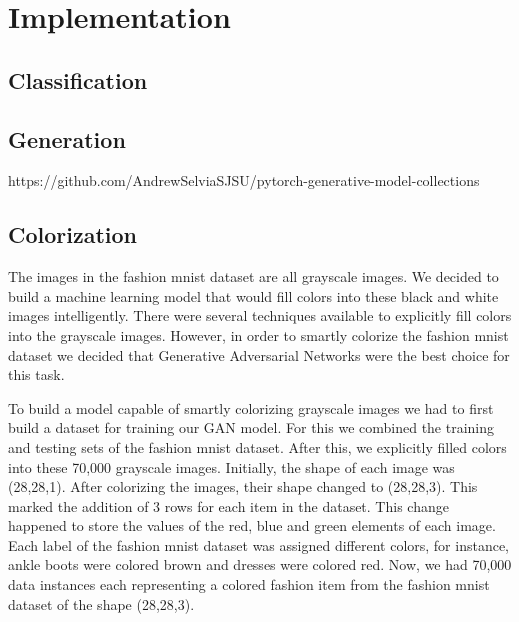 \documentclass[conference]{IEEEtran}
\begin{document}
    \section{Implementation}\label{sec:implementation}

    \subsection{Classification}\label{subsec:implementation-classification}

    \subsection{Generation}\label{subsec:implementation-generation}

    https://github.com/AndrewSelviaSJSU/pytorch-generative-model-collections

    \subsection{Colorization}\label{subsec:implementation-colorization}
	
	The images in the fashion mnist dataset are all grayscale images. We decided to build a machine learning model that would fill colors into these black and white images intelligently. There were several techniques available to explicitly fill colors into the grayscale images. However, in order to smartly colorize the fashion mnist dataset we decided that Generative Adversarial Networks were the best choice for this task. 

	To build a model capable of smartly colorizing grayscale images we had to first build a dataset for training our GAN model. For this we combined the training and testing sets of the fashion mnist dataset. After this, we explicitly filled colors into these 70,000 grayscale images. Initially, the shape of each image was (28,28,1). After colorizing the images, their shape changed to (28,28,3). This marked the addition of 3 rows for each item in the dataset. This change happened to store the values of the red, blue and green elements of each image. Each label of the fashion mnist dataset was assigned different colors, for instance, ankle boots were colored brown and dresses were colored red. Now, we had 70,000 data instances each representing a colored fashion item from the fashion mnist dataset of the shape (28,28,3).
\end{document}
